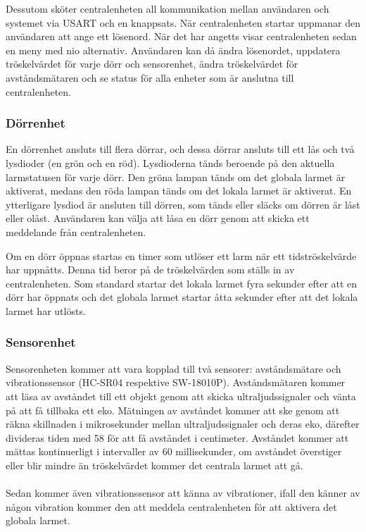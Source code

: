 \documentclass{article}
\begin{document}
Dessutom sköter centralenheten all kommunikation mellan användaren och systemet via USART och en knappsats. När centralenheten startar uppmanar den användaren att ange ett lösenord. När det har angetts visar centralenheten sedan en meny med nio alternativ. Användaren kan då ändra lösenordet, uppdatera tröskelvärdet för varje dörr och sensorenhet, ändra tröskelvärdet för avståndsmätaren och se status för alla enheter som är anslutna till centralenheten.

\subsubsection{Dörrenhet}
En dörrenhet ansluts till flera dörrar, och dessa dörrar ansluts till ett lås och två lysdioder (en grön och en röd). Lysdioderna tänds beroende på den aktuella larmstatusen för varje dörr. Den gröna lampan tänds om det globala larmet är aktiverat, medans den röda lampan tänds om det lokala larmet är aktiverat. En ytterligare lysdiod är ansluten till dörren, som tänds eller släcks om dörren är låst eller olåst. Användaren kan välja att låsa en dörr genom att skicka ett meddelande från centralenheten. 

Om en dörr öppnas startas en timer som utlöser ett larm när ett tidströskelvärde har uppnåtts. Denna tid beror på de tröskelvärden som ställs in av centralenheten. Som standard startar det lokala larmet fyra sekunder efter att en dörr har öppnats och det globala larmet startar åtta sekunder efter att det lokala larmet har utlösts. 

\subsubsection{Sensorenhet}

Sensorenheten kommer att vara kopplad till två sensorer: avståndsmätare och vibrationssensor (HC-SR04 respektive SW-18010P).
Avståndsmätaren kommer att läsa av avståndet till ett objekt genom att skicka ultraljudssignaler och vänta på att få tillbaka ett eko. 
Mätningen av avståndet kommer att ske genom att räkna skillnaden i mikrosekunder mellan ultraljudssignaler och deras eko, därefter divideras tiden med 58 för att få avståndet i centimeter. 
Avståndet kommer att mättas kontinuerligt i intervaller av 60 millisekunder, om avståndet överstiger eller blir mindre än tröskelvärdet kommer det centrala larmet att gå.\\
\\
Sedan kommer även vibrationssensor att känna av vibrationer, ifall den känner av någon vibration kommer den att meddela centralenheten för att aktivera det globala larmet.
\end{document}
